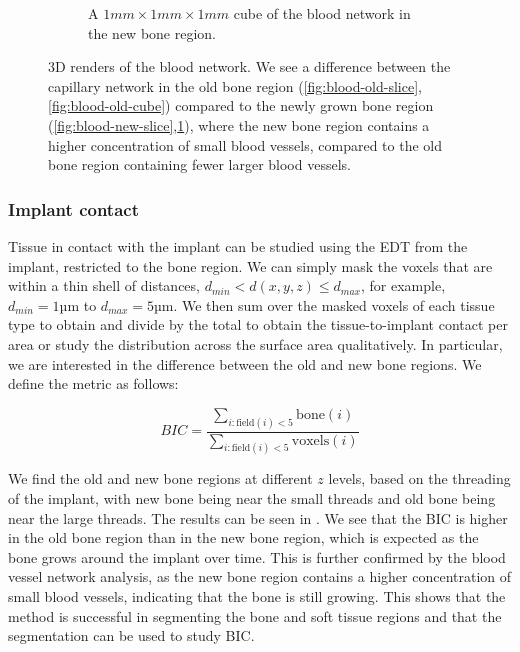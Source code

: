 \begin{figure}
\begin{subfigure}[b]{.48\linewidth}
        \caption{A $1mm \times 1 mm \times 1 mm$ cube of the blood network in the new bone region.}
        \label{fig:blood-new-cube}
    \end{subfigure}
    \caption{
        3D renders of the blood network. We see a difference between the
        capillary network in the old bone region
        (\ref{fig:blood-old-slice},\ref{fig:blood-old-cube}) compared to the
        newly grown bone region
        (\ref{fig:blood-new-slice},\ref{fig:blood-new-cube}), where the new
        bone region contains a higher concentration of small blood vessels,
        compared to the old bone region containing fewer larger blood vessels.
    }
    \label{fig:blood-network}
\end{figure}

\subsubsection{Implant contact}
\label{sec:contact}

Tissue in contact with the implant can be studied using the EDT from the
implant, restricted to the bone region. We can simply mask the voxels that are
within a thin shell of distances, $d_{min} < d(x,y,z) \le d_{max}$, for
example, $d_{min} = 1 \text{µm}$ to $d_{max} = 5 \text{µm}$. We then sum over
the masked voxels of each tissue type to obtain and divide by the total to
obtain the tissue-to-implant contact per area or study the distribution across
the surface area qualitatively. In particular, we are interested in the
difference between the old and new bone regions. We define the metric as
follows:

\begin{equation}
    BIC = \frac{\sum_{i : \text{field}(i) < 5} \text{bone}(i)}{\sum_{i : \text{field}(i) < 5} \text{voxels}(i)}
\end{equation}

We find the old and new bone regions at different $z$ levels, based on the
threading of the implant, with new bone being near the small threads and old
bone being near the large threads. The results can be seen in .
We see that the BIC is higher in the old bone region than in the new bone
region, which is expected as the bone grows around the implant over time. This
is further confirmed by the blood vessel network analysis, as the new bone
region contains a higher concentration of small blood vessels, indicating that
the bone is still growing. This shows that the method is successful in
segmenting the bone and soft tissue regions and that the segmentation can be
used to study BIC.


